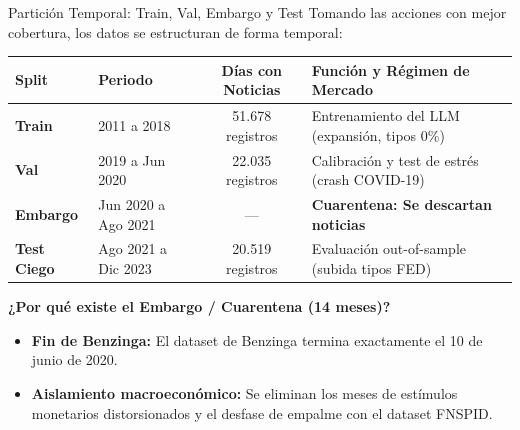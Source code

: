 \documentclass[aspectratio=169,11pt]{beamer}
\begin{document}
\begin{frame}{Partición Temporal: Train, Val, Embargo y Test}
    Tomando las acciones con mejor cobertura, los datos se estructuran de forma temporal:
    \vspace{0.3cm}
    
    \begin{table}[]
        \centering \small
        \begin{tabular}{@{}llcl@{}}
        \toprule
        \textbf{Split} & \textbf{Periodo} & \textbf{Días con Noticias} & \textbf{Función y Régimen de Mercado} \\ \midrule
        \textbf{Train}      & 2011 a 2018         & 51.678 registros           & Entrenamiento del LLM (expansión, tipos 0\%) \\
        \textbf{Val}        & 2019 a Jun 2020     & 22.035 registros           & Calibración y test de estrés (crash COVID-19) \\
        \textbf{Embargo}    & Jun 2020 a Ago 2021 & ---                        & \textbf{Cuarentena: Se descartan noticias} \\
        \textbf{Test Ciego} & Ago 2021 a Dic 2023 & 20.519 registros           & Evaluación out-of-sample (subida tipos FED) \\ \bottomrule
        \end{tabular}
    \end{table}
    
    \vspace{0.2cm}
    \begin{block}{\textbf{¿Por qué existe el Embargo / Cuarentena (14 meses)?}}
        \begin{itemize}
            \item \textbf{Fin de Benzinga:} El dataset de Benzinga termina exactamente el 10 de junio de 2020.
            \item \textbf{Aislamiento macroeconómico:} Se eliminan los meses de estímulos monetarios distorsionados y el desfase de empalme con el dataset FNSPID.
        \end{itemize}
    \end{block}
\end{frame}
\end{document}

